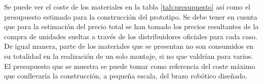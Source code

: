     Se puede ver el coste de los materiales en la tabla \ref{tab:presupuesto} así como el presupuesto estimado para la construcción del prototipo. Se debe tener en cuenta que para la estimación del precio total se han tomado los precios resultantes de la compra de unidades sueltas a través de los distribuidores oficiales para cada caso. De igual manera, parte de los materiales que se presentan no son consumidos en su totalidad  en la realización de un solo montaje, si no que valdrían para varios. 
    \\
    
    El presupuesto que se muestra se puede tomar como referencia del coste máximo que conllevaría la construcción, a pequeña escala, del brazo robótico diseñado.

    \renewcommand{\thempfootnote}{\arabic{mpfootnote}}

